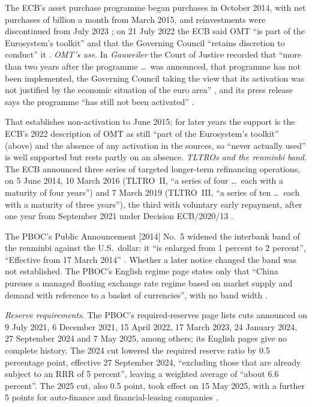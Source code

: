 \begin{qfrule}
The ECB's asset purchase programme began purchases in October 2014, with net purchases of  billion a month from March 2015, and reinvestments were discontinued from July 2023 \citep[APP page]{ecb-app}; on 21 July 2022 the ECB said OMT ``is part of the Eurosystem's toolkit'' and that the Governing Council ``retains discretion to conduct'' it \citep[Transmission Protection Instrument release]{ecb-tpi-2022}. \emph{OMT's use}. In \emph{Gauweiler} the Court of Justice recorded that ``more than two years after the programme \dots\ was announced, that programme has not been implemented, the Governing Council taking the view that its activation was not justified by the economic situation of the euro area'' \citep[Case C-62/14, judgment of 16 June 2015, para.~84, via CELLAR]{cjeu-gauweiler-2015}, and its press release says the programme ``has still not been activated'' \citep[Press Release No~70/15]{cjeu-gauweiler-2015}.

That establishes non-activation to June 2015; for later years the support is the ECB's 2022 description of OMT as still ``part of the Eurosystem's toolkit'' (above) and the absence of any activation in the sources, so ``never actually used'' is well supported but rests partly on an absence. \emph{TLTROs and the renminbi band}. The ECB announced three series of targeted longer-term refinancing operations, on 5 June 2014, 10 March 2016 (TLTRO~II, ``a series of four \dots\ each with a maturity of four years'') and 7 March 2019 (TLTRO~III, ``a series of ten \dots\ each with a maturity of three years''), the third with voluntary early repayment, after one year from September 2021 under Decision ECB/2020/13 \citep[TLTRO page]{ecb-tltro}.

The PBOC's Public Announcement [2014] No.~5 widened the interbank band of the renminbi against the U.S.\ dollar: it ``is enlarged from 1 percent to 2 percent'', ``Effective from 17 March 2014'' \citep[English text on the State Council's site, attributed to \texttt{pbc.gov.cn}]{pboc-2014-5}. Whether a later notice changed the band was not established. The PBOC's English regime page states only that ``China pursues a managed floating exchange rate regime based on market supply and demand with reference to a basket of currencies'', with no band width \citep[Exchange Rate Regime page]{pboc-en-2026}.

\emph{Reserve requirements}. The PBOC's required-reserves page lists cuts announced on 9 July 2021, 6 December 2021, 15 April 2022, 17 March 2023, 24 January 2024, 27 September 2024 and 7 May 2025, among others; its English pages give no complete history. The 2024 cut lowered the required reserve ratio by 0.5 percentage point, effective 27 September 2024, ``excluding those that are already subject to an RRR of 5 percent'', leaving a weighted average of ``about 6.6 percent''. The 2025 cut, also 0.5 point, took effect on 15 May 2025, with a further 5 points for auto-finance and financial-leasing companies \citep[Required Reserves page and the two announcements]{pboc-en-2026}.


\end{qfrule}

